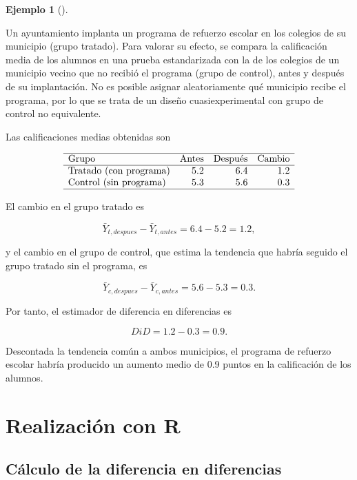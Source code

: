 \documentclass[
  spanish,
  a4paper,
]{scrreport}
\theoremstyle{definition}
\newtheorem{example}{Ejemplo}[chapter]
\theoremstyle{definition}
\theoremstyle{remark}
\begin{document}
\begin{example}[]\protect\hypertarget{exm-cuasiexperimentales-did-refuerzo-escolar}{}\label{exm-cuasiexperimentales-did-refuerzo-escolar}

Un ayuntamiento implanta un programa de refuerzo escolar en los colegios
de su municipio (grupo tratado). Para valorar su efecto, se compara la
calificación media de los alumnos en una prueba estandarizada con la de
los colegios de un municipio vecino que no recibió el programa (grupo de
control), antes y después de su implantación. No es posible asignar
aleatoriamente qué municipio recibe el programa, por lo que se trata de
un diseño cuasiexperimental con grupo de control no equivalente.

Las calificaciones medias obtenidas son

\[
\begin{array}{lrrr}
\hline
\mbox{Grupo} & \mbox{Antes} & \mbox{Después} & \mbox{Cambio}\\
\hline
\mbox{Tratado (con programa)} & 5.2 & 6.4 & 1.2\\
\mbox{Control (sin programa)} & 5.3 & 5.6 & 0.3\\
\hline
\end{array}
\]

El cambio en el grupo tratado es

\[\bar{Y}_{t,despues} - \bar{Y}_{t,antes} = 6.4 - 5.2 = 1.2,\]

y el cambio en el grupo de control, que estima la tendencia que habría
seguido el grupo tratado sin el programa, es

\[\bar{Y}_{c,despues} - \bar{Y}_{c,antes} = 5.6 - 5.3 = 0.3.\]

Por tanto, el estimador de diferencia en diferencias es

\[DiD = 1.2 - 0.3 = 0.9.\]

Descontada la tendencia común a ambos municipios, el programa de
refuerzo escolar habría producido un aumento medio de 0.9 puntos en la
calificación de los alumnos.

\end{example}

\section{Realización con R}\label{realizaciuxf3n-con-r-6}

\subsection{Cálculo de la diferencia en
diferencias}\label{cuxe1lculo-de-la-diferencia-en-diferencias}
\end{document}
